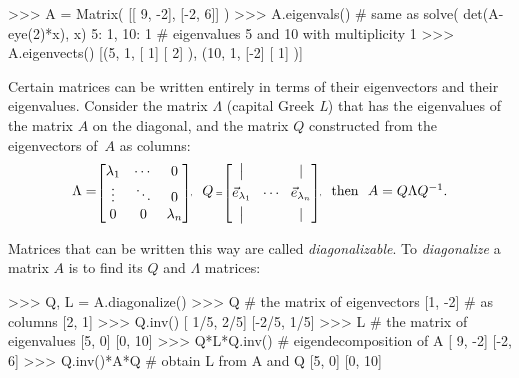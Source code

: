 		

\small
\begin{verbatimtab}
>>> A = Matrix( [[ 9, -2],
                 [-2,  6]] )
>>> A.eigenvals()   # same as  solve( det(A-eye(2)*x), x)
{5: 1, 10: 1}       # eigenvalues 5 and 10 with multiplicity 1
>>> A.eigenvects()   
[(5, 1, [ 1]  
        [ 2]  ),      (10, 1, [-2]
                              [ 1]  )]
\end{verbatimtab}
\normalsize

\noindent


		Certain matrices can be written entirely in terms of their eigenvectors and their eigenvalues.
		Consider the matrix $\Lambda$ (capital Greek \emph{L}) that has the eigenvalues of the matrix $A$ on the diagonal, 
		and the matrix $Q$ constructed from the eigenvectors of~$A$ as columns:
		    \[
		     \Lambda = 
		    \scriptscriptstyle
		     \begin{bmatrix}
		     \lambda_1	&  \cdots  &  0 \\
		     \vdots 	&  \ddots  &  0  \\
		     0  	&   0      &  \lambda_n
		     \end{bmatrix}\!,
		     \ \ 
		     {\textstyle Q} \: 
		     = 
		     \begin{bmatrix}
		     \big|  &  &\Huge| \\[1.2mm]
		     \vec{e}_{\lambda_1}  & \!  \cdots \! &  \large\vec{e}_{\lambda_n} \\[1.2mm]
		     \big|  &  & \Huge| 
		     \end{bmatrix}\!,
		     \ \ 
		     {\textstyle
		     \textrm{then}
		     \ \ 
		     A =  Q\Lambda Q^{-1}.
		     }
		    \]

		Matrices that can be written this way are called \emph{diagonalizable}.		
To \emph{diagonalize} a matrix $A$ is to find its $Q$ and $\Lambda$ matrices:

\small
\begin{verbatimtab}
>>> Q, L = A.diagonalize()
>>> Q               # the matrix of eigenvectors 
[1,  -2]            # as columns 
[2,   1]
>>> Q.inv()
[ 1/5, 2/5]
[-2/5, 1/5]
>>> L               # the matrix of eigenvalues
[5,  0]
[0, 10]
>>> Q*L*Q.inv()     # eigendecomposition of A
[ 9, -2]
[-2,  6]
>>> Q.inv()*A*Q     # obtain L from A and Q 
[5,  0]
[0, 10]
\end{verbatimtab}
\normalsize
		
